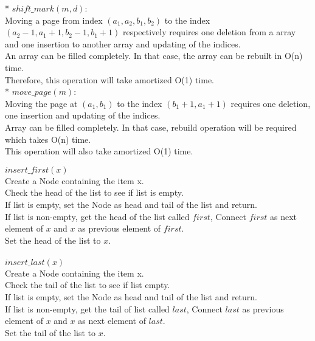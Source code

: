 \documentclass[12pt,twoside]{article}
\begin{document}
\begin{problems}
* $shift\_mark(m, d)$: \\
Moving a page from index $(a_1, a_2, b_1, b_2)$ to the index $(a_2 - 1, a_1 + 1, b_2 - 1, b_1 + 1)$ respectively requires one deletion from a array and one insertion to another array and updating of the indices. \\ 
An array can be filled completely. In that case, the array can be rebuilt in O(n) time.\\

Therefore, this operation will take amortized O(1) time. \\

* $move\_page(m)$: \\
Moving the page at $(a_1, b_1)$ to the index $(b_1 + 1, a_1 + 1)$ requires one deletion, one insertion and updating of the indices. \\
Array can be filled completely. In that case, rebuild operation will be required which takes O(n) time. \\

This operation will also take amortized O(1) time.
\newpage
\problem  %

\begin{problemparts}
\problempart %
$insert\_first(x)$ \\
Create a Node containing the item x. \\
Check the head of the list to see if list is empty. \\
If list is empty, set the Node as head and tail of the list and return. \\
If list is non-empty, get the head of the list called $first$, Connect $first$ as next element of $x$ and $x$ as previous element of $first$. \\ 
Set the head of the list to $x$. \\ \\
$insert\_last(x)$ \\
Create a Node containing the item x. \\
Check the tail of the list to see if list empty. \\
If list is empty, set the Node as head and tail of the list and return. \\
If list is non-empty, get the tail of list called $last$,
Connect $last$ as previous element of $x$ and $x$ as next element of $last$.\\
Set the tail of the list to $x$. \\ \\


\end{problemparts}
\end{problems}
\end{document}
